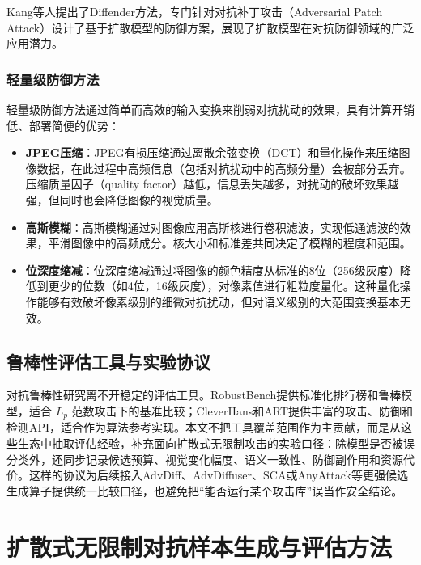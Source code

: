 \documentclass[type=bachelor,oneside]{fduthesis}
\begin{document}
Kang等人\cite{liu2024diffender}提出了Diffender方法，专门针对对抗补丁攻击（Adversarial Patch Attack）设计了基于扩散模型的防御方案，展现了扩散模型在对抗防御领域的广泛应用潜力。

\subsection{轻量级防御方法}

轻量级防御方法通过简单而高效的输入变换来削弱对抗扰动的效果，具有计算开销低、部署简便的优势：

\begin{itemize}
  \item \textbf{JPEG压缩}：JPEG有损压缩通过离散余弦变换（DCT）和量化操作来压缩图像数据，在此过程中高频信息（包括对抗扰动中的高频分量）会被部分丢弃。压缩质量因子（quality factor）越低，信息丢失越多，对扰动的破坏效果越强，但同时也会降低图像的视觉质量。
  \item \textbf{高斯模糊}：高斯模糊通过对图像应用高斯核进行卷积滤波，实现低通滤波的效果，平滑图像中的高频成分。核大小和标准差共同决定了模糊的程度和范围。
  \item \textbf{位深度缩减}：位深度缩减通过将图像的颜色精度从标准的8位（256级灰度）降低到更少的位数（如4位，16级灰度），对像素值进行粗粒度量化。这种量化操作能够有效破坏像素级别的细微对抗扰动，但对语义级别的大范围变换基本无效。
\end{itemize}

\section{鲁棒性评估工具与实验协议}
\label{sec:platforms}

对抗鲁棒性研究离不开稳定的评估工具。RobustBench\cite{croce2021robustbench}提供标准化排行榜和鲁棒模型，适合 $L_p$ 范数攻击下的基准比较；CleverHans\cite{papernot2018cleverhans}和ART\cite{nicolae2018adversarial}提供丰富的攻击、防御和检测API，适合作为算法参考实现。本文不把工具覆盖范围作为主贡献，而是从这些生态中抽取评估经验，补充面向扩散式无限制攻击的实验口径：除模型是否被误分类外，还同步记录候选预算、视觉变化幅度、语义一致性、防御副作用和资源代价。这样的协议为后续接入AdvDiff、AdvDiffuser、SCA或AnyAttack等更强候选生成算子提供统一比较口径，也避免把“能否运行某个攻击库”误当作安全结论。

\chapter{扩散式无限制对抗样本生成与评估方法}
\label{chap:design}
\end{document}
